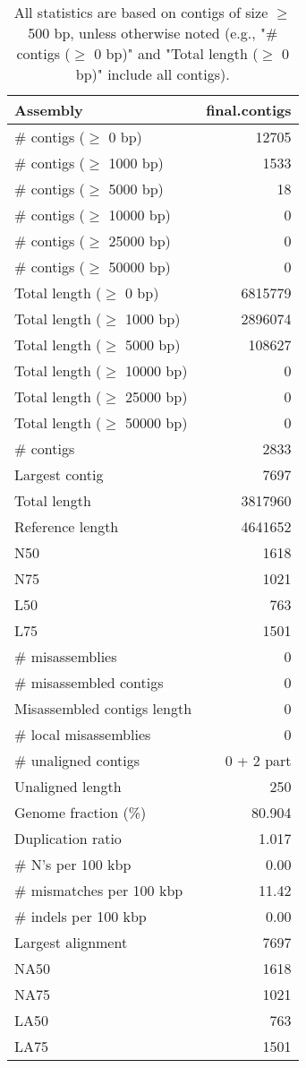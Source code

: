 \documentclass[12pt,a4paper]{article}
\begin{document}
\begin{table}[ht]
\begin{center}
\caption{All statistics are based on contigs of size $\geq$ 500 bp, unless otherwise noted (e.g., "\# contigs ($\geq$ 0 bp)" and "Total length ($\geq$ 0 bp)" include all contigs).}
\begin{tabular}{|l*{1}{|r}|}
\hline
Assembly & final.contigs \\ \hline
\# contigs ($\geq$ 0 bp) & 12705 \\ \hline
\# contigs ($\geq$ 1000 bp) & 1533 \\ \hline
\# contigs ($\geq$ 5000 bp) & 18 \\ \hline
\# contigs ($\geq$ 10000 bp) & 0 \\ \hline
\# contigs ($\geq$ 25000 bp) & 0 \\ \hline
\# contigs ($\geq$ 50000 bp) & 0 \\ \hline
Total length ($\geq$ 0 bp) & 6815779 \\ \hline
Total length ($\geq$ 1000 bp) & 2896074 \\ \hline
Total length ($\geq$ 5000 bp) & 108627 \\ \hline
Total length ($\geq$ 10000 bp) & 0 \\ \hline
Total length ($\geq$ 25000 bp) & 0 \\ \hline
Total length ($\geq$ 50000 bp) & 0 \\ \hline
\# contigs & 2833 \\ \hline
Largest contig & 7697 \\ \hline
Total length & 3817960 \\ \hline
Reference length & 4641652 \\ \hline
N50 & 1618 \\ \hline
N75 & 1021 \\ \hline
L50 & 763 \\ \hline
L75 & 1501 \\ \hline
\# misassemblies & 0 \\ \hline
\# misassembled contigs & 0 \\ \hline
Misassembled contigs length & 0 \\ \hline
\# local misassemblies & 0 \\ \hline
\# unaligned contigs & 0 + 2 part \\ \hline
Unaligned length & 250 \\ \hline
Genome fraction (\%) & 80.904 \\ \hline
Duplication ratio & 1.017 \\ \hline
\# N's per 100 kbp & 0.00 \\ \hline
\# mismatches per 100 kbp & 11.42 \\ \hline
\# indels per 100 kbp & 0.00 \\ \hline
Largest alignment & 7697 \\ \hline
NA50 & 1618 \\ \hline
NA75 & 1021 \\ \hline
LA50 & 763 \\ \hline
LA75 & 1501 \\ \hline
\end{tabular}
\end{center}
\end{table}
\end{document}
